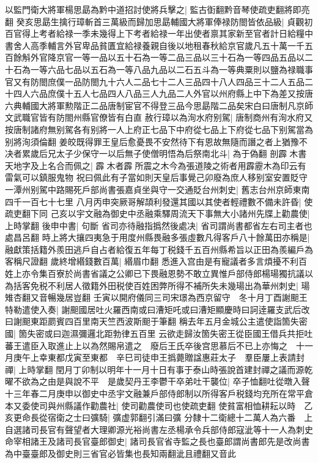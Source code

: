 以監門衛大將軍楊思勗為黔中道招討使將兵擊之|{
	監古衘翻黔音琴使疏吏翻將即亮翻}
癸亥思勗生擒行璋斬首三萬級而歸加思勗輔國大將軍俸禄防閤皆依品級|{
	貞觀初百官得上考者給禄一季未幾得上下考者給禄一年出使者禀其家新至官者計日給糧中書舍人高季輔言外官卑品貧匱宜給禄養親自後以地租春秋給京官歲凡五十萬一千五百餘斛外官降京官一等一品以五十石為一等二品三品以三十石為一等四品五品以二十石為一等六品七品以五石為一等八品九品以二石五斗為一等典粟則以鹽為禄職事官又有防閤庶僕一品防閤九十六人二品七十二人三品四十八人四品三十二人五品二十四人六品庶僕十五人七品四人八品三人九品二人外官以州府縣上中下為差又按唐六典輔國大將軍勲階正二品唐制宦官不得登三品今思勗階二品矣宋白曰唐制凡京師文武職官皆有防閤州縣官僚皆有白直}
赦行璋以為洵水府别駕|{
	唐制商州有洵水府又按唐制諸府無别駕各有别將一人上府正七品下中府從七品上下府從七品下别駕當為别將洵須倫翻}
姜皎既得罪王皇后愈憂畏不安然待下有恩故無隨而譖之者上猶豫不决者累歲后兄太子少保守一以后無子使僧明悟為后祭南北斗|{
	為于偽翻}
剖霹木書天地字及上名合而佩之|{
	霹木者霹所震之木今為張道陵之術者用霹靂木為印云有雷氣可以鎮服鬼物}
祝曰佩此有子當如則天皇后事覺己卯廢為庶人移别室安置貶守一潭州别駕中路賜死戶部尚書張嘉貞坐與守一交通貶台州刺史|{
	舊志台州京師東南四千一百七十七里}
八月丙申突厥哥解頡利發還其國以其使者輕禮數不備未許昏|{
	使疏吏翻下同}
己亥以宇文融為御史中丞融乘驛周流天下事無大小諸州先牒上勸農使|{
	上時掌翻}
後申中書|{
	句斷}
省司亦待融指撝然後處决|{
	省司謂尚書都省左右司主者也處昌呂翻}
時上將大攘四夷急于用度州縣畏融多張虛數凡得客戶八十餘萬田亦稱是|{
	融獻策括籍外羨田逃戶自占者給復五年每丁税錢千五百州縣希旨以正田為羨編戶為客稱尺證翻}
歲終增緡錢數百萬|{
	緡眉巾翻}
悉進入宫由是有寵議者多言煩擾不利百姓上亦令集百寮於尚書省議之公卿已下畏融恩勢不敢立異惟戶部侍郎楊瑒獨抗議以為括客免税不利居人徵籍外田税使百姓困弊所得不補所失未幾瑒出為華州刺史|{
	瑒雉杏翻又音暢幾居豈翻}
壬寅以開府儀同三司宋璟為西京留守　冬十月丁酉謝䫻王特勒遣使入奏|{
	謝䫻國居吐火羅西南或曰漕矩吒或曰漕矩顯慶時曰訶逹羅支武后改曰謝䫻東距罽賓四百里南天竺西波斯䫻于筆翻}
稱去年五月金城公主遣使詣箇失密國|{
	箇失密或曰迦濕彌邏北距勃律五百里}
云欲走歸汝箇失密王從臣國王借兵共拒吐蕃王遣臣入取進止上以為然賜帛遣之　廢后王氏卒後宫思慕后不已上亦悔之　十一月庚午上幸東都戊寅至東都　辛巳司徒申王撝薨贈諡惠莊太子　羣臣屢上表請封禪|{
	上時掌翻}
閏月丁卯制以明年十一月十日有事于泰山時張說首建封禪之議而源乾曜不欲為之由是與說不平　是歲契丹王李鬱干卒弟吐干襲位|{
	卒子恤翻吐從暾入聲}
十三年春二月庚申以御史中丞宇文融兼戶部侍郎制以所得客戶税錢均充所在常平倉本又委使司與州縣議作勸農社|{
	使司勸農使司也使疏吏翻}
使貧富相恤耕耘以時　乙亥更命長從宿衛之士曰彍騎|{
	彍虚郭翻引滿曰彍}
分隸十二衛總十二萬人為六番　上自選諸司長官有聲望者大理卿源光裕尚書左丞楊承令兵部侍郎寇泚等十一人為刺史命宰相諸王及諸司長官臺郎御史|{
	諸司長官省寺監之長也臺郎謂尚書郎先是改尚書為中臺臺郎及御史則三省官必皆集也長知兩翻泚且禮翻又音此}
